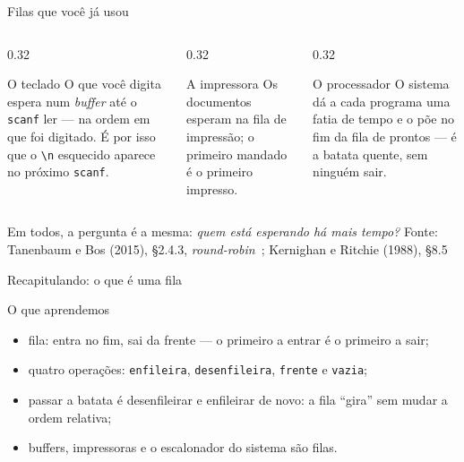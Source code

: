 \documentclass[aspectratio=169]{beamer}
\newcommand{\fonte}[1]{\vfill\hfill{\scriptsize\textcolor{UFSGray}{Fonte: #1}}}
\begin{document}
\begin{frame}{Filas que você já usou}
  \begin{columns}[T]
    \begin{column}{0.32\textwidth}
      \begin{block}{O teclado}
        \small O que você digita espera num \emph{buffer} até o
        \texttt{scanf} ler --- na ordem em que foi digitado. É por isso que
        o \texttt{\textbackslash n} esquecido aparece no próximo
        \texttt{scanf}.
      \end{block}
    \end{column}
    \begin{column}{0.32\textwidth}
      \begin{block}{A impressora}
        \small Os documentos esperam na fila de impressão; o primeiro
        mandado é o primeiro impresso.
      \end{block}
    \end{column}
    \begin{column}{0.32\textwidth}
      \begin{block}{O processador}
        \small O sistema dá a cada programa uma fatia de tempo e o põe no fim
        da fila de prontos --- é a batata quente, sem ninguém sair.
      \end{block}
    \end{column}
  \end{columns}
  \medskip
  \small Em todos, a pergunta é a mesma: \emph{quem está esperando há mais
  tempo?}
  \fonte{Tanenbaum e Bos (2015), §2.4.3, \emph{round-robin}~\cite{tanenbaum2015modern};
    Kernighan e Ritchie (1988), §8.5~\cite{kernighan1988c}}
\end{frame}

\begin{frame}{Recapitulando: o que é uma fila}
  \begin{block}{O que aprendemos}
    \begin{itemize}
      \item fila: entra no fim, sai da frente --- o primeiro a entrar é o
        primeiro a sair;
      \item quatro operações: \texttt{enfileira}, \texttt{desenfileira},
        \texttt{frente} e \texttt{vazia};
      \item passar a batata é desenfileirar e enfileirar de novo: a fila
        ``gira'' sem mudar a ordem relativa;
      \item buffers, impressoras e o escalonador do sistema são filas.
    \end{itemize}
  \end{block}
\end{frame}
\end{document}
